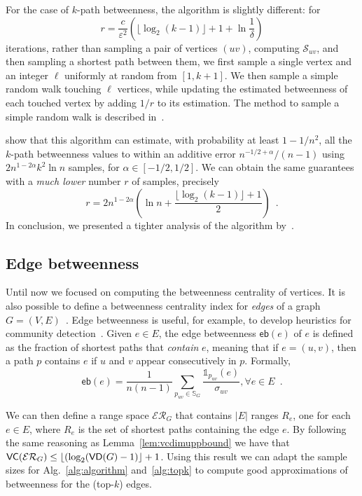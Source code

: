 For the case of $k$-path betweenness, the algorithm is slightly different:
for 
\[
  r= \frac{c}{\varepsilon^2}\left(\lfloor\log_2(k-1)\rfloor + 1 +\ln\frac{1}{\delta}\right)
\]
iterations, rather than sampling a pair of vertices $(uv)$, computing
$\mathcal{S}_{uv}$, and then sampling a shortest path between them, we first sample a
single vertex and an integer $\ell$ uniformly at random from $[1,k+1]$. We then
sample a simple random walk touching $\ell$ vertices, while updating the estimated
betweenness of each touched vertex by adding $1/r$ to its estimation. The method
to sample a simple random walk is described in~\citep{KourtellisASIT12}.

\citet{KourtellisASIT12} show that this algorithm can estimate, with probability
at least $1-1/n^2$, all the $k$-path betweenness values to within an additive
error $n^{-1/2+\alpha}/(n-1)$ using $2n^{1-2\alpha}k^2\ln n$ samples, for
$\alpha\in[-1/2,1/2]$. We can obtain the same guarantees with a \emph{much
lower} number $r$ of samples, precisely
\[
r=2n^{1-2\alpha}\left(\ln n+\frac{\lfloor\log_2(k-1)\rfloor+1}{2}\right)\enspace.
\]
In conclusion, we presented a tighter analysis of the algorithm
by~\citet{KourtellisASIT12}.

\subsection{Edge betweenness}
Until now we focused on computing the betweenness centrality of vertices. It is
also possible to define a betweenness centrality index for \emph{edges} of a
graph $G=(V,E)$~\citep{Anthonisse71,Brandes08}. Edge betweenness is useful, for
example, to develop heuristics for community detection~\citep{NewmanG04}. Given
$e\in E$, the edge betweenness $\mathsf{eb}(e)$ of $e$ is defined as the
fraction of shortest paths that \emph{contain} $e$, meaning that if $e=(u,v)$,
then a path $p$ contains $e$ if $u$ and $v$ appear consecutively in $p$.
Formally,
\[
\mathsf{eb}(e)=\frac{1}{n(n-1)}\sum_{p_{uv}\in\mathbb{S}_G}\frac{\mathds{1}_{p_{uv}}(e)}{\sigma_{uv}}, \forall e\in E\enspace.
\]

We can then define a range space $\mathcal{ER}_G$ that contains $|E|$ ranges $R_e$, one
for each $e\in E$, where $R_e$ is the set of shortest paths containing the edge
$e$. By following the same reasoning as Lemma~\ref{lem:vcdimuppbound} we have that
$\mathsf{VC}(\mathcal{ER}_G)\le\lfloor(\log_2(\mathsf{VD}(G) - 1)\rfloor + 1$. Using this result we can
adapt the sample sizes for Alg.~\ref{alg:algorithm} and~\ref{alg:topk} to
compute good approximations of betweenness for the (top-$k$) edges.

\fi

